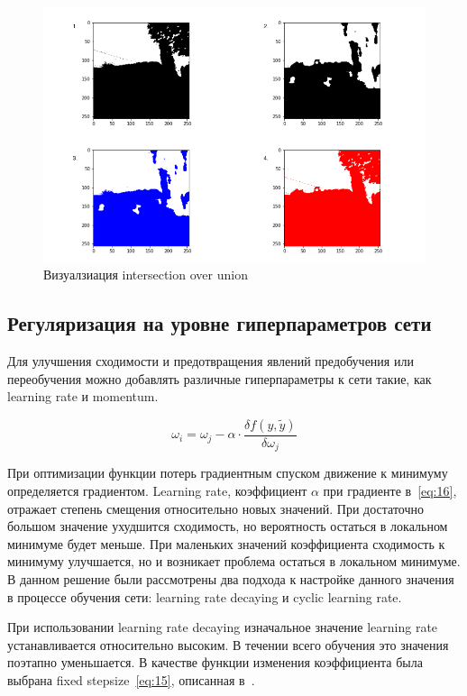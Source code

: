 \begin{figure}[H]
    \centering
    \includegraphics[width=\textwidth]{img/iou_vis.png}
    \caption{Визуалзиация intersection over union}
    \label{fig:iou_vis}
\end{figure}

\subsection{Регуляризация на уровне гиперпараметров сети}

Для улучшения сходимости и предотвращения явлений предобучения или переобучения можно добавлять различные гиперпараметры к сети такие, как learning rate и momentum.

\begin{equation}
    \label{eq:16}
    \omega_{i} = \omega_{j} - \alpha \cdot \frac{\delta f(y, \tilde{y})}{\delta\omega_{j}}
\end{equation}

При оптимизации функции потерь градиентным спуском движение к минимуму определяется градиентом.
Learning rate, коэффициент $\alpha$ при градиенте в~\eqref{eq:16}, отражает степень смещения относительно новых значений.
При достаточно большом значение ухудшится сходимость, но вероятность остаться в локальном минимуме будет меньше.
При маленьких значений коэффициента сходимость к минимуму улучшается, но и возникает проблема остаться в локальном минимуме.
В данном решение были рассмотрены два подхода к настройке данного значения в процессе обучения сети: learning rate decaying и cyclic learning rate.

При использовании learning rate decaying изначальное значение learning rate устанавливается относительно высоким.
В течении всего обучения это значения поэтапно уменьшается.
В качестве функции изменения коэффициента была выбрана fixed stepsize~\eqref{eq:15}, описанная в~\autocite{wu2019demystifying}.

